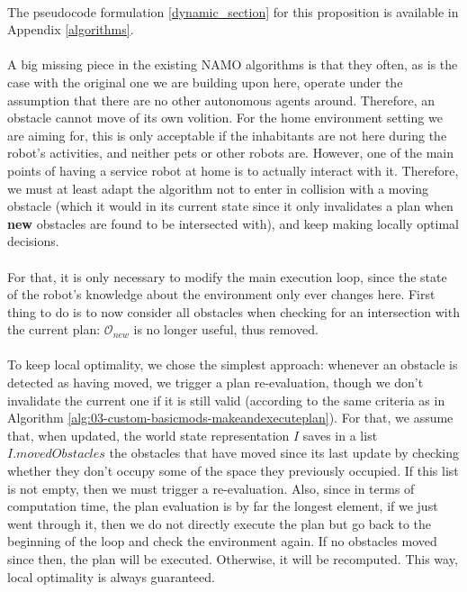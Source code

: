 \paragraph{} The pseudocode formulation \ref{dynamic_section} for this proposition is available in Appendix \ref{algorithms}.

\paragraph{} A big missing piece in the existing NAMO algorithms is that they often, as is the case with the original one we are building upon here, operate under the assumption that there are no other autonomous agents around. Therefore, an obstacle cannot move of its own volition. For the home environment setting we are aiming for, this is only acceptable if the inhabitants are not here during the robot's activities, and neither pets or other robots are. However, one of the main points of having a service robot at home is to actually interact with it. Therefore, we must at least adapt the algorithm not to enter in collision with a moving obstacle (which it would in its current state since it only invalidates a plan when \textbf{new} obstacles are found to be intersected with), and keep making locally optimal decisions.

\paragraph{} For that, it is only necessary to modify the main execution loop, since the state of the robot's knowledge about the environment only ever changes here. First thing to do is to now consider all obstacles when checking for an intersection with the current plan: $\mathcal{O}_{new}$ is no longer useful, thus removed.

\paragraph{} To keep local optimality, we chose the simplest approach: whenever an obstacle is detected as having moved, we trigger a plan re-evaluation, though we don't invalidate the current one if it is still valid (according to the same criteria as in Algorithm  \ref{alg:03-custom-basicmods-makeandexecuteplan}). For that, we assume that, when updated, the world state representation $I$ saves in a list $I.movedObstacles$ the obstacles that have moved since its last update by checking whether they don't occupy some of the space they previously occupied. If this list is not empty, then we must trigger a re-evaluation. Also, since in terms of computation time, the plan evaluation is by far the longest element, if we just went through it, then we do not directly execute the plan but go back to the beginning of the loop and check the environment again. If no obstacles moved since then, the plan will be executed. Otherwise, it will be recomputed. This way, local optimality is always guaranteed.


